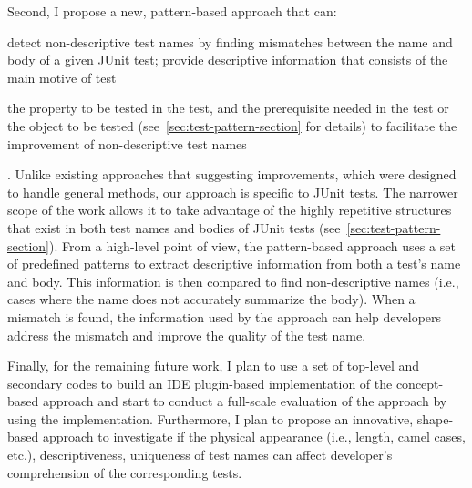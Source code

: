Second, I propose a new, pattern-based approach that can:
\begin{enumerate*}
\item detect non-descriptive test names by finding mismatches between the name and body of a given JUnit test; provide descriptive information that consists of the main motive of test
\item the property to be tested in the test, and the prerequisite needed in the test or the object to be tested (see~\cref{sec:test-pattern-section} for details) to facilitate the improvement of non-descriptive test names
\end{enumerate*}.
%
Unlike existing approaches that suggesting improvements, which were designed to handle general methods, our approach is specific to JUnit tests.
%
The narrower scope of the work allows it to take advantage of the highly repetitive structures that exist in both test names and bodies of JUnit tests (see~\cref{sec:test-pattern-section}).
%
From a high-level point of view, the pattern-based approach uses a set of predefined patterns to extract descriptive information from both a test's name and body.
%
This information is then compared to find non-descriptive names (i.e., cases where the name does not accurately summarize the body).
%
When a mismatch is found, the information used by the approach can help developers address the mismatch and improve the quality of the test name.


Finally, for the remaining future work, I plan to use a set of top-level and secondary codes to build an IDE plugin-based implementation of the concept-based approach and start to conduct a full-scale evaluation of the approach by using the implementation.
%
Furthermore, I plan to propose an innovative, shape-based approach to investigate if the physical appearance (i.e., length, camel cases, etc.), descriptiveness, uniqueness of test names can affect developer's comprehension of the corresponding tests.